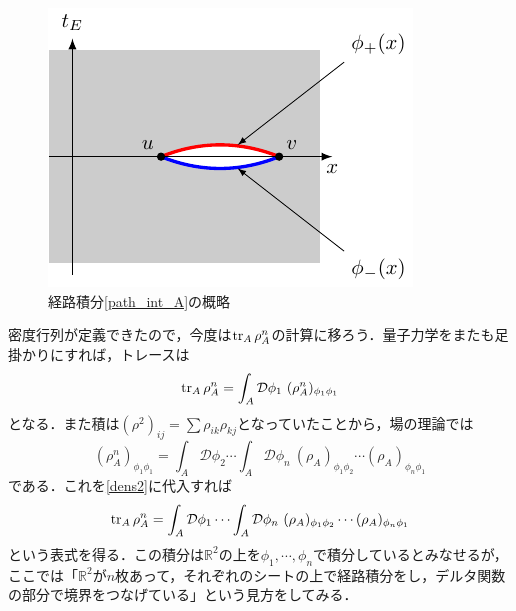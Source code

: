 \documentclass[a4paper,uplatex,dvipdfmx]{jsarticle}
\theoremstyle{definition}
\begin{document}
\begin{figure}[ht]
  \centering
  \includegraphics[keepaspectratio]{fig/path_int_region/path_int_region.pdf}  
  \caption{経路積分\eqref{path_int_A}の概略}
  \label{path_int_region}
\end{figure}

密度行列が定義できたので，今度は$\tr_{A}\rho_{A}^n$の計算に移ろう．量子力学をまたも足掛かりにすれば，トレースは
\begin{equation}
  \tr_{A}\rho_{A}^{n}
  =
  \int_{A}\mathcal{D}\phi_{1}\ 
  (\rho_{A}^{n})_{\phi_{1}\phi_{1}}
  \label{dens2}
\end{equation}
となる．また積は$(\rho^2)_{ij}=\sum\rho_{ik}\rho_{kj}$となっていたことから，場の理論では
\begin{equation}
  (\rho_{A}^{n})_{\phi_{1}\phi_{1}}
  =
  \int_{A}\mathcal{D}{\phi_{2}}
  \cdots
  \int_{A}\mathcal{D}{\phi_{n}}\ 
  (\rho_A)_{\phi_{1}\phi_{2}}
  \cdots
  (\rho_A)_{\phi_{n}\phi_{1}}
\end{equation}
である．これを\eqref{dens2}に代入すれば
\begin{equation}
  \tr_{A}\rho_{A}^{n}
  =
  \int_{A}\mathcal{D}\phi_{1}
  \cdots
  \int_A\mathcal{D}{\phi_{n}}\ 
  (\rho_A)_{\phi_{1}\phi_{2}}
  \cdots
  (\rho_A)_{\phi_{n}\phi_{1}}
  \label{dens3}
\end{equation}
という表式を得る．この積分は$\mathbb{R}^2$の上を$\phi_1,\cdots,\phi_n$で積分しているとみなせるが，ここでは「$\mathbb{R}^2$が$n$枚あって，それぞれのシートの上で経路積分をし，デルタ関数の部分で境界をつなげている」という見方をしてみる．
\end{document}
